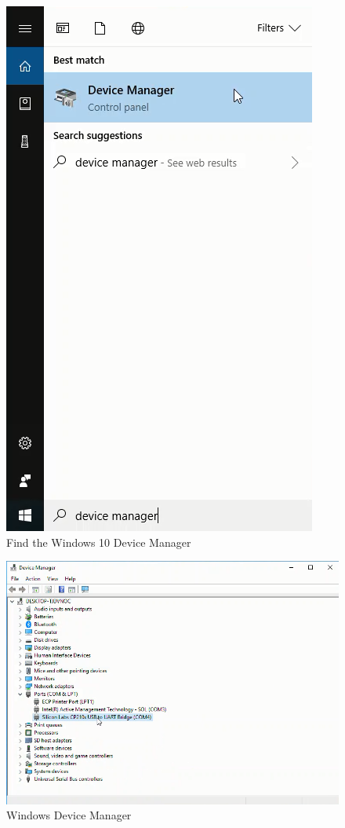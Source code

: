 \documentclass{book}
\makeatletter
\def\maxwidth{\ifdim\Gin@nat@width>\linewidth\linewidth
    \else\Gin@nat@width\fi}
\let\Oldincludegraphics\includegraphics
\renewcommand{\includegraphics}[1]{\Oldincludegraphics[width=.8\maxwidth]{#1}}
\makeatother
\begin{document}
\begin{figure}
\centering
\includegraphics{images/find_device_manager.png}
\caption{Find the Windows 10 Device Manager}
\end{figure}

\begin{figure}
\centering
\includegraphics{images/device_manager_menu.png}
\caption{Windows Device Manager}
\end{figure}
    
\end{document}
